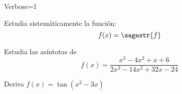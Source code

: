 \documentclass[palatino,nosec]{Docencia}
\begin{document}
\newif\ifverbose
\verbosetrue

\newcommand{\newexample}[1]{
	
	
	\newpage
}

\ifverbose
\begin{sagesilent}
	Verbose=1
\end{sagesilent}
\else
\begin{sagesilent}
	Verbose=0
\end{sagesilent}
\fi



\begin{problem} Estudia sistemáticamente la función: \[f(x) =\sagestr{f}\]
	
	\solution
	
	\newexample{tex/fun}
\end{problem}


\begin{problem} Estudia las asíntotas de \[f(x) =\frac{x^3-4x^2+x+6}{2x^3-14x^2+32x-24}\]
\solution
\end{problem}
\begin{problem} Deriva $f(x) = \tan(x^2-3x)$
\solution
\end{problem}
\end{document}

